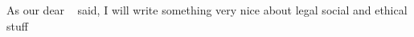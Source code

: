 As our dear \citeauthor{HerbertF:1965:Dune}~\cite{HerbertF:1965:Dune} said, I will write something very nice about
legal social and ethical stuff
